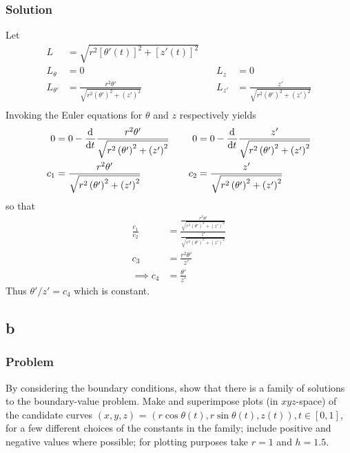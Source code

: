 \documentclass[12pt,twoside]{article}
\begin{document}
\subsubsection*{Solution}
Let
\begin{align*}
  L &= \sqrt{r^2{[\theta'(t)]}^2 + {[z'(t)]}^2} \\
  L_{\theta} &= 0 &\quad L_{z} &= 0 \\
  L_{\theta'} &= \frac{r^2 \theta '}{\sqrt{r^2 \left(\theta '\right)^2+\left(z'\right)^2}}
             &\quad L_{z'} &= \frac{z'}{\sqrt{r^2 \left(\theta '\right)^2+\left(z'\right)^2}} \\
\end{align*}
Invoking the Euler equations for $\theta$ and $z$ respectively yields
\begin{align*}
  0 &= 0 - \frac{\mathrm{d}^{} {}}{\mathrm{d}{t}^{}}\frac{r^2 \theta '}{\sqrt{r^2 \left(\theta '\right)^2+\left(z'\right)^2}} &\quad 0 &= 0 - \frac{\mathrm{d}^{} {}}{\mathrm{d}{t}^{}}\frac{z'}{\sqrt{r^2 \left(\theta '\right)^2+\left(z'\right)^2}} \\
  c_1 &= \frac{r^2 \theta '}{\sqrt{r^2 \left(\theta '\right)^2+\left(z'\right)^2}} &\quad c_2 &= \frac{z'}{\sqrt{r^2 \left(\theta '\right)^2+\left(z'\right)^2}} \\
\end{align*}
so that
\begin{align*}
  \frac{c_1}{c_2} &= \frac{\frac{r^2 \theta '}{\sqrt{r^2 \left(\theta '\right)^2+\left(z'\right)^2}}}{\frac{z'}{\sqrt{r^2 \left(\theta '\right)^2+\left(z'\right)^2}}} \\
  c_3 &= \frac{r^2\theta'}{z'} \\
  \implies c_4 &= \frac{\theta'}{z'}
\end{align*}
Thus $\theta'/z'=c_4$ which is constant.
\subsection{b}
\subsubsection*{Problem}
By considering the boundary conditions, show that there is a family of solutions
to the boundary-value problem. Make and superimpose plots (in $xyz$-space) of
the candidate curves $(x,y,z)$ = $(r\cos\theta(t),r\sin\theta(t),z(t)), t\in[0,1]$,
for a few different choices of the constants in the family; include positive and
negative values where possible; for plotting purposes take $r = 1$ and $h =
1.5$.
\end{document}
